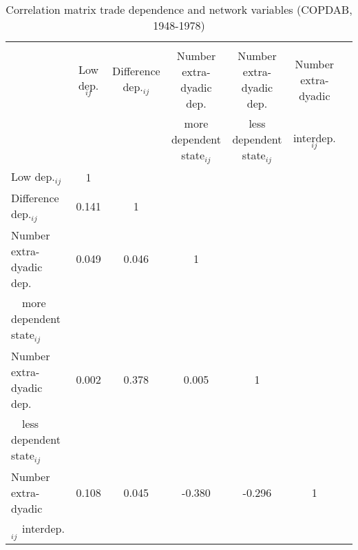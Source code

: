 \begin{table}[htbp]\centering \scriptsize
\caption{Correlation matrix trade dependence and network variables (COPDAB, 1948-1978) \label{tab5:correlationmatrixnetworkvarscopdab}}
\begin{tabular}{l*{6}{c}} \toprule
          &\multicolumn{5}{c}{}                                       \\
          &Low dep.$_{ij}$& Difference dep.$_{ij}$&Number extra-dyadic dep.&Number extra-dyadic dep.&Number extra-dyadic\\
	&              &                                        &more dependent state$_{ij}$& less dependent state$_{ij}$    & interdep.$_{ij}$\\
\midrule
Low dep.$_{ij}$&        1&                  &         &         &         \\
Difference dep.$_{ij}$&    0.141&           1&         &         &         \\
Number extra-dyadic dep.&   0.049&  0.046&        1&         &         \\
~~more dependent state$_{ij}$&                   &            &            &              &                \\
Number extra-dyadic dep.&  0.002&        0.378&  0.005&        1&         \\
~~less dependent state$_{ij}$&                    &            &            &              &                \\
Number extra-dyadic&    0.108&      0.045&   -0.380&   -0.296&        1\\
~~interdep.$_{ij}$&                    &            &            &              &                \\
\bottomrule
\end{tabular}
\end{table}

